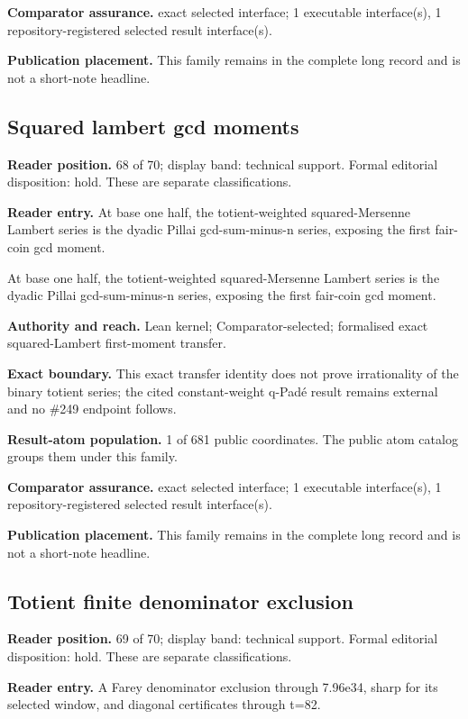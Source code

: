 \textbf{Comparator assurance.} exact selected interface; 1 executable interface(s), 1 repository-registered selected result interface(s).

\textbf{Publication placement.} This family remains in the complete long record and is not a short-note headline.

\subsection{Squared lambert gcd moments}
\textbf{Reader position.} 68 of 70; display band: technical support.  Formal editorial disposition: hold.  These are separate classifications.

\textbf{Reader entry.} At base one half, the totient-weighted squared-Mersenne Lambert series is the dyadic Pillai gcd-sum-minus-n series, exposing the first fair-coin gcd moment.

At base one half, the totient-weighted squared-Mersenne Lambert series is the dyadic Pillai gcd-sum-minus-n series, exposing the first fair-coin gcd moment.

\textbf{Authority and reach.} Lean kernel; Comparator-selected; formalised exact squared-Lambert first-moment transfer.

\textbf{Exact boundary.} This exact transfer identity does not prove irrationality of the binary totient series; the cited constant-weight q-Padé result remains external and no \#249 endpoint follows.

\textbf{Result-atom population.} 1 of 681 public coordinates. The public atom catalog groups them under this family.

\textbf{Comparator assurance.} exact selected interface; 1 executable interface(s), 1 repository-registered selected result interface(s).

\textbf{Publication placement.} This family remains in the complete long record and is not a short-note headline.

\subsection{Totient finite denominator exclusion}
\textbf{Reader position.} 69 of 70; display band: technical support.  Formal editorial disposition: hold.  These are separate classifications.

\textbf{Reader entry.} A Farey denominator exclusion through 7.96e34, sharp for its selected window, and diagonal certificates through t=82.


